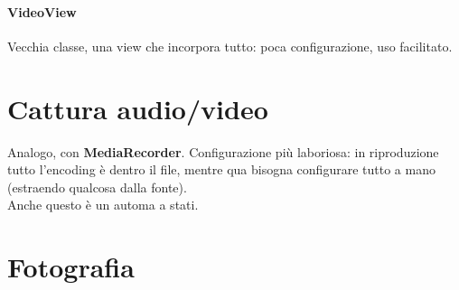 \documentclass[10pt]{book}
\begin{document}
\paragraph{VideoView} Vecchia classe, una view che incorpora tutto: poca configurazione, uso facilitato.
\section{Cattura audio/video}
Analogo, con \textbf{MediaRecorder}. Configurazione più laboriosa: in riproduzione tutto l'encoding è dentro il file, mentre qua bisogna configurare tutto a mano (estraendo qualcosa dalla fonte).\\
Anche questo è un automa a stati.
\section{Fotografia}
\end{document}
